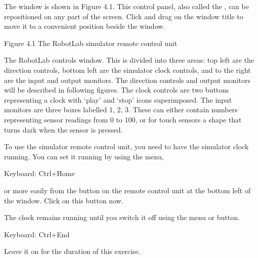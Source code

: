 \documentclass[letterpaper,10pt,english]{sphinxmanual}
\begin{document}
The  window is shown in Figure 4.1. This control panel, also called the , can be repositioned on any part of the screen. Click and drag on the  window title to move it to a convenient position beside the  window.


Figure 4.1 The RobotLab simulator remote control unit

The RobotLab controls window. This is divided into three areas: top left are the direction controls, bottom left are the simulator clock controls, and to the right are the input and output monitors. The direction controls and output monitors will be described in following figures. The clock controls are two buttons representing a clock with ‘play’ and ‘stop’ icons superimposed. The input monitors are three boxes labelled 1, 2, 3. These can either contain numbers representing sensor readings from
0 to 100, or for touch sensors a shape that turns dark when the sensor is pressed.

To use the simulator remote control unit, you need to have the simulator clock running. You can set it running by using the  menu,





Keyboard: Ctrl+Home





or more easily from the   button on the remote control unit at the bottom left of the  window. Click on this button now.

The clock remains running until you switch it off using the  menu or  button.





Keyboard: Ctrl+End





Leave it on for the duration of this exercise.
\end{document}
